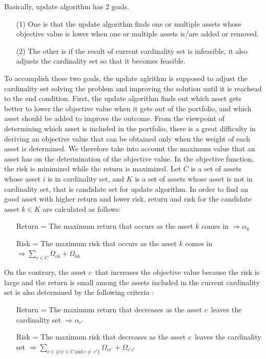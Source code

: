 \documentclass[11pt]{article}
\begin{document}
	
	Basically, update algorithm has 2 goals. 
	\begin{itemize}
		\item[(1)] One is that the update algorithm finds one or multiple assets whose objective value is lower when one or multiple assets is/are added or removed. 
		\item[(2)] The other is if the result of current cardinality set is infeasible, it also adjusts the cardinality set so that it becomes feasible.
	\end{itemize}
	To accomplish these two goals, the update aglrithm is supposed to adjust the cardinality set solving the problem and improving the solution until it is reachead to the end condition. First, the update algorithm finds out which asset gets better to lower the objective value when it gets out of the portfolio, and which asset should be added to improve the outcome. From the viewpoint of determining which asset is included in the portfolio, there is a great difficulty in deriving an objective value that can be obtained only when the weight of each asset is determined. We therefore take into account the maximum value that an asset has on the determination of the objective value. In the objective function, the risk is minimized while the return is maximized. Let $C$ is a set of assets whose asset $i$ is in cardinality set, and $K$ is a set of assets whose asset is not in cardinality set, that is candidate set for update algorithm. In order to find an good asset with higher return and lower risk, return and risk for the candidate asset $k \in K$ are calculated as follows:
	\begin{itemize}
		\item[\textbullet] Return = The maximum return that occurs as the asset $k$ comes in $\Rightarrow \alpha_k$
		\item[\textbullet] Risk = The maximum risk that occurs as the asset $k$ comes in $\Rightarrow \sum_{c \in C}\Omega_{ck} + \Omega_{kk}$
	\end{itemize}
	On the contrary, the asset $c$\textasciiacute$\,$ that increases the objective value because the risk is large and the return is small among the assets included in the current cardinality set is also determined by the following criteria : 
	\begin{itemize}
		\item[\textbullet] Return = The maximum return that decreases as the asset $c$\textasciiacute$\,$ leaves the cardinality set $\Rightarrow \alpha_{{c}'}$
		\item[\textbullet] Risk =  The maximum risk that decreases as the asset $c$\textasciiacute$\,$ leaves the cardinality set $\Rightarrow \sum_{c \in \{c | c \in C \, \text{and} \, c \neq \ {c}' \}}\Omega_{c {c}'} + \Omega_{{c}' {c}'}$
	\end{itemize}
\end{document}
